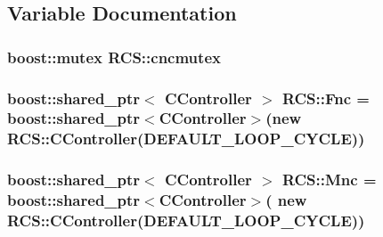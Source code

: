 \subsection{Variable Documentation}
\hypertarget{namespaceRCS_a021572a9d03c82d96029e82ea5691d60}{
\subsubsection[{cncmutex}]{\setlength{\rightskip}{0pt plus 5cm}boost\-::mutex R\-C\-S\-::cncmutex}}\label{namespaceRCS_a021572a9d03c82d96029e82ea5691d60}
\hypertarget{namespaceRCS_a7e9552ea392162dd1bb9dcc89e6184fb}{
\subsubsection[{Fnc}]{\setlength{\rightskip}{0pt plus 5cm}boost\-::shared\-\_\-ptr$<$ {\bf C\-Controller} $>$ R\-C\-S\-::\-Fnc = boost\-::shared\-\_\-ptr$<${\bf C\-Controller}$>$(new {\bf R\-C\-S\-::\-C\-Controller}({\bf D\-E\-F\-A\-U\-L\-T\-\_\-\-L\-O\-O\-P\-\_\-\-C\-Y\-C\-L\-E}))}}\label{namespaceRCS_a7e9552ea392162dd1bb9dcc89e6184fb}
\hypertarget{namespaceRCS_a7743d3581146fcdb467ee8cedaa5ebef}{
\subsubsection[{Mnc}]{\setlength{\rightskip}{0pt plus 5cm}boost\-::shared\-\_\-ptr$<$ {\bf C\-Controller} $>$ R\-C\-S\-::\-Mnc = boost\-::shared\-\_\-ptr$<${\bf C\-Controller}$>$( new {\bf R\-C\-S\-::\-C\-Controller}({\bf D\-E\-F\-A\-U\-L\-T\-\_\-\-L\-O\-O\-P\-\_\-\-C\-Y\-C\-L\-E}))}}\label{namespaceRCS_a7743d3581146fcdb467ee8cedaa5ebef}
